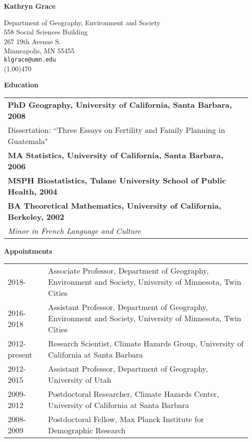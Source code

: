 \documentclass[11pt]{article} %
\begin{document}
\centerline{\Large\textbf{Kathryn Grace}}  

\bigskip
\noindent 
Department of Geography, Environment and Society\\
558 Social Sciences Building\\
267 19th Avenue S.\\
Minneapolis, MN 55455\\
   {\tt klgrace@umn.edu} \\
\noindent
\line(1,00){470}
\bigskip




\noindent
\textbf{Education}


\noindent
\begin{tabular}{lp{12cm}}
 \textbf{PhD Geography, University of California, Santa Barbara, 2008}\\
 Dissertation: ``Three Essays on Fertility and Family Planning in Guatemala"\\
\textbf {MA Statistics, University of California, Santa Barbara, 2006}\\
\textbf {MSPH Biostatistics, Tulane University School of Public Health, 2004}\\
\textbf {BA Theoretical Mathematics, University of California, Berkeley, 2002}\\
{\it Minor in French Language and Culture}\\
\end{tabular}

\vspace{.5 cm}


\noindent
\textbf{Appointments}


\noindent
\begin{tabular}{lp{12cm}}
2018-  & Associate Professor, Department of Geography, Environment and Society, University of Minnesota, Twin Cities\\
2016- 2018 & Assistant Professor, Department of Geography, Environment and Society, University of Minnesota, Twin Cities\\
2012-present & Research Scientist, Climate Hazards Group, University of California at Santa Barbara \\
2012-2015 & Assistant Professor, Department of Geography, University of Utah \\
2009-2012 & Postdoctoral Researcher, Climate Hazards Center, University of California at Santa Barbara \\
2008-2009 & Postdoctoral Fellow, Max Planck Institute for Demographic Research \\
\end{tabular}
\end{document}
